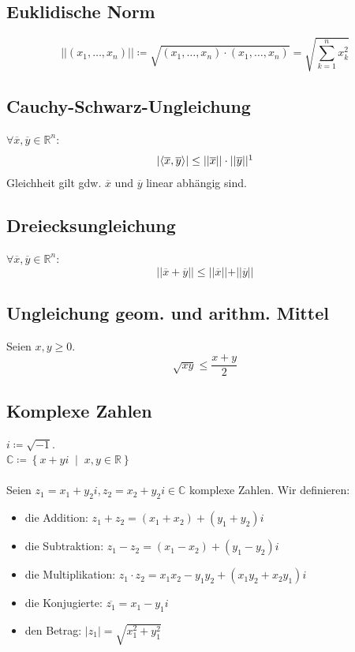 \documentclass[halfparscip]{scrartcl}
\newcounter{subsection2}
\begin{document}
\subsection*{Euklidische Norm}
\begin{equation*}
\vert\vert (x_1, \dots, x_n) \vert\vert \coloneqq \sqrt{(x_1, \dots, x_n)\cdot(x_1, \dots, x_n)} = \sqrt{\sum_{k=1}^{n}x^2_k}
\end{equation*}

\subsection{Cauchy-Schwarz-Ungleichung}
$\forall \overline{x},\overline{y}\in\mathbb{R}^n$:
\begin{equation*}
	\left\vert\left<\overline{x},\overline{y}\right>\right\vert \leq \vert\vert\overline{x}\vert\vert \cdot \vert\vert\overline{y}\vert\vert\footnotemark
\end{equation*}
Gleichheit gilt gdw. $\overline{x}$ und $\overline{y}$ linear abhängig sind.

\subsection{Dreiecksungleichung}
$\forall \overline{x},\overline{y}\in\mathbb{R}^n$:
\begin{equation*}
	\vert\vert \overline{x} + \overline{y} \vert\vert \leq \vert\vert\overline{x}\vert\vert + \vert\vert\overline{y}\vert\vert
\end{equation*}

\subsection{Ungleichung geom. und arithm. Mittel}
Seien $x,y \geq 0$.
\begin{equation*}
	\sqrt{xy} \leq \frac{x + y}{2}
\end{equation*}

\subsection*{Komplexe Zahlen}
$i \coloneqq \sqrt{-1}$.\\
$\mathbb{C} \coloneqq \left\{x + yi \;\middle|\; x, y \in \mathbb{R}\right\}$\\\\
Seien $z_1 = x_1 + y_2i, z_2 = x_2 + y_2i \in \mathbb{C}$ komplexe Zahlen. Wir definieren:
\begin{itemize}
	\item die Addition: $z_1 + z_2 = (x_1 + x_2) + (y_1 + y_2)i$
	\item die Subtraktion: $z_1 - z_2 = (x_1 - x_2) + (y_1 - y_2)i$
	\item die Multiplikation: $z_1 \cdot z_2 = x_1x_2 - y_1y_2 + (x_1y_2 + x_2y_1)i$
	\item die Konjugierte: $\overline{z_1} = x_1 - y_1i$
	\item den Betrag: $\vert z_1\vert = \sqrt{x_1^2 + y_1^2}$
\end{itemize}
\end{document}
